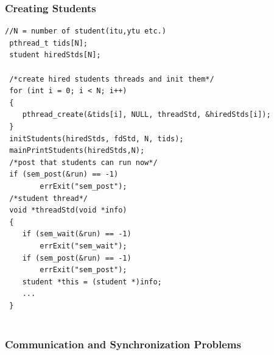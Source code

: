 \documentclass{article}
\begin{document}
\subsubsection*{Creating Students}
\begin{lstlisting}[style=CStyle]
 //N = number of student(itu,ytu etc.)
 pthread_t tids[N];
 student hiredStds[N];
  
 /*create hired students threads and init them*/
 for (int i = 0; i < N; i++)
 {
    pthread_create(&tids[i], NULL, threadStd, &hiredStds[i]);
 }
 initStudents(hiredStds, fdStd, N, tids);
 mainPrintStudents(hiredStds,N);
 /*post that students can run now*/
 if (sem_post(&run) == -1)
        errExit("sem_post");
 /*student thread*/
 void *threadStd(void *info)
 {
    if (sem_wait(&run) == -1)
        errExit("sem_wait");
    if (sem_post(&run) == -1)
        errExit("sem_post");
    student *this = (student *)info;
    ...
 }
       
\end{lstlisting}

\subsubsection{Communication and Synchronization Problems}
\end{document}
